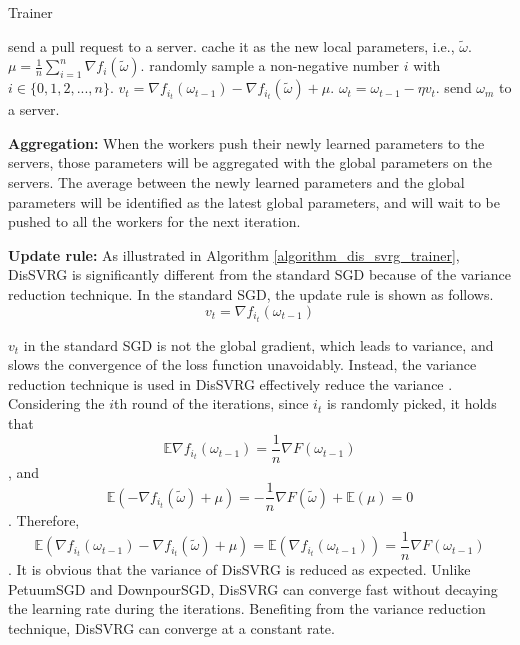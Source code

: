 \documentclass[preprint,review,11pt,a4paper]{elsarticle}
\begin{document}
\begin{algorithm}[t]
    \caption{Trainer}
    \label{algorithm_dis_svrg_trainer}
    \begin{algorithmic}[1]
            \State send a pull request to a server.
                    \State cache it as the new local parameters, i.e., $\tilde{\omega}$.
                    \State $\mu=\frac{1}{n}\sum\limits_{i=1}^n\nabla f_i(\tilde{\omega})$.
                       \State randomly sample a non-negative number $i$ with $i\in\{0,1, 2,...,n\}$.
	              \State $v_t=\nabla f_{i_t}(\omega_{t-1})-\nabla f_{i_t}(\tilde{\omega})+\mu$.
	              \State $\omega_t=\omega_{t-1}-\eta v_t$.
                    \EndFor
                    \State send  $\omega_m$ to a server.
               \EndIf
        \EndWhile
      \EndWhile
    \end{algorithmic}
\end{algorithm}

\textbf{Aggregation:} When the workers push their newly learned parameters to the servers, those parameters will be aggregated with the global parameters on the servers. The average between the newly learned parameters and the global parameters will be identified as the latest global parameters, and will wait to be pushed to all the workers for the next iteration.

\textbf{Update rule:} As illustrated in Algorithm \ref{algorithm_dis_svrg_trainer}, DisSVRG is significantly different from the standard SGD because of the variance reduction technique. In the standard SGD, the update rule is shown as follows.
\begin{equation}
\label{standard_sgd}
v_t=\nabla f_{i_t}(\omega_{t-1})
\end{equation}

$v_t$ in the standard SGD is not the global gradient, which leads to variance, and slows the convergence of the loss function unavoidably. Instead, the variance reduction technique is used in DisSVRG effectively reduce the variance \cite{Johnson:9MAvkbgy}. Considering the $i$th round of the iterations, since $i_t$ is randomly picked, it holds that
\begin{equation}
\mathbb{E}\nabla f_{i_t}(\omega_{t-1})=\frac{1}{n}\nabla F(\omega_{t-1})
\end{equation}, and
\begin{equation}
\mathbb{E}(-\nabla f_{i_t}(\tilde{\omega})+\mu)=-\frac{1}{n} \nabla F(\tilde{\omega})+\mathbb{E}(\mu)=0
\end{equation}. Therefore,
\begin{equation}
\mathbb{E}(\nabla f_{i_t}(\omega_{t-1})-\nabla f_{i_t}(\tilde{\omega})+\mu)=\mathbb{E}(\nabla f_{i_t}(\omega_{t-1}))=\frac{1}{n}\nabla F(\omega_{t-1})
\end{equation}. It is obvious that the variance of DisSVRG is reduced as expected. Unlike PetuumSGD and DownpourSGD, DisSVRG can converge fast without decaying the learning rate during the iterations. Benefiting from the variance reduction technique, DisSVRG  can converge at a constant rate.
\end{document}
